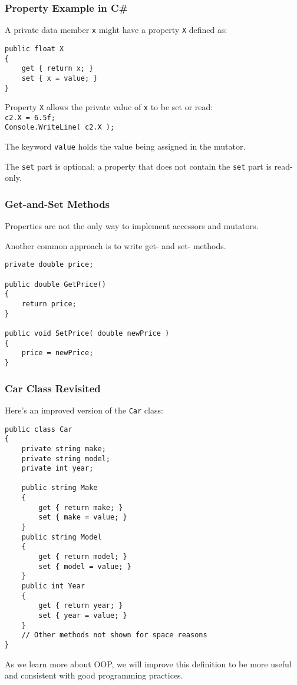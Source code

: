 \begin{frame}[fragile]
\frametitle{Property Example in C\#}
A private data member \texttt{x} might have a property \texttt{X} defined as:

\begin{verbatim}
public float X
{
    get { return x; }
    set { x = value; }
}
\end{verbatim}

Property \texttt{X} allows the private value of \texttt{x} to be set or read:\\
\quad \texttt{c2.X = 6.5f;}\\
\quad \texttt{Console.WriteLine( c2.X );}

The keyword \alert{\texttt{value}} holds the value being assigned in the mutator.

The \texttt{set} part is optional; a property that does not contain the \texttt{set} part is read-only.

\end{frame}

\begin{frame}[fragile]
\frametitle{Get-and-Set Methods}
Properties are not the only way to implement accessors and mutators.

Another common approach is to write get- and set- methods.

\begin{verbatim}
private double price;

public double GetPrice()
{
    return price;
}

public void SetPrice( double newPrice )
{
    price = newPrice;
}
\end{verbatim}

\end{frame}


\begin{frame}[fragile]
\frametitle{Car Class Revisited}

Here's an improved version of the \texttt{Car} class:

{\scriptsize
\begin{verbatim}
public class Car
{
    private string make;
    private string model;
    private int year;
    
    public string Make 
    {
        get { return make; }
        set { make = value; }
    }
    public string Model 
    {
        get { return model; }
        set { model = value; }
    }
    public int Year 
    {
        get { return year; }
        set { year = value; }
    }
    // Other methods not shown for space reasons
}
\end{verbatim}
}

As we learn more about OOP, we will improve this definition to be more useful and consistent with good programming practices.

\end{frame}



